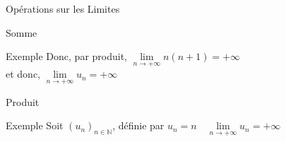 \documentclass{cours}
\begin{document}
\begin{Gpartie}{Opérations sur les Limites}
\begin{Spartie}{Somme}
\begin{SSpartie}{Exemple}
                Donc, par produit, $\lim\limits_{n\to +\infty}n(n+1)=+\infty$ \\ et donc, $\lim\limits_{n\to +\infty}u_n=+\infty$
            \end{SSpartie}
        \end{Spartie}
        \begin{Spartie}{Produit}
            \begin{center}
            \end{center}
            \parbox{\linewidth}{}
            \begin{SSpartie}{Exemple} 
                Soit $(u_n)_{n\in\mathbb{N}}$, définie par $u_n=n\quad\lim\limits_{n\to +\infty}u_n=+\infty$


\end{SSpartie}
\end{Spartie}
\end{Gpartie}
\end{document}
